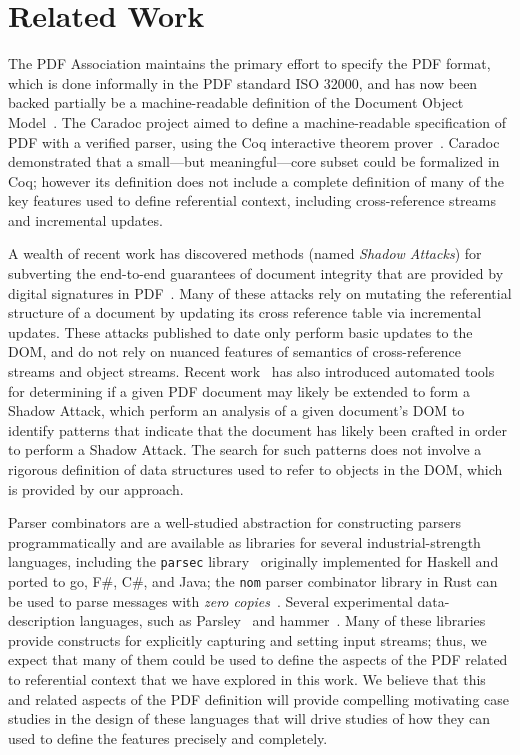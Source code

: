 \section{Related Work}
\label{sec:rel-work}

The PDF Association maintains the primary effort to specify the PDF
format, which is done informally in the PDF standard ISO 32000, and has now
been backed partially be a machine-readable definition of the Document
Object Model~\cite{peterwyattArlingtonPDFModel2021}.
%
The Caradoc project aimed to define a machine-readable specification
of PDF with a verified parser, using the Coq interactive theorem
prover~\cite{g.endignouxCaradocPragmaticApproach2016}.
%
Caradoc demonstrated that a small---but meaningful---core subset could
be formalized in Coq;
%
however its definition does not include a complete definition of many
of the key features used to define referential context, including
cross-reference streams and incremental updates.

A wealth of recent work has discovered methods (named \emph{Shadow
  Attacks}) for subverting the end-to-end guarantees of document
integrity that are provided by digital signatures in
PDF~\cite{mullerPracticalDecryptionExFiltration2019,mladenovTrillionDollarRefund2019,mullerProcessingDangerousPaths2021,ndsssymposiumNDSS2021Shadow2021,rohlmannBreakingSpecificationPDF2021}.
%
Many of these attacks rely on mutating the referential structure of a
document by updating its cross reference table via incremental
updates.
%
These attacks published to date only perform basic
updates to the DOM, and do not rely on nuanced features of semantics
of cross-reference streams and object streams.
%
Recent work~\cite{itextShadowAttack} has also introduced automated
tools for determining if a given PDF document may likely be extended
to form a Shadow Attack, which perform an analysis of a given
document's DOM to identify patterns that indicate that the document
has likely been crafted in order to perform a Shadow Attack.
%
The search for such patterns does not involve a rigorous definition of
data structures used to refer to objects in the DOM, which is provided
by our approach.

Parser combinators are a well-studied abstraction for constructing
parsers programmatically and are available as libraries for several
industrial-strength languages, including the \texttt{parsec}
library~\cite{leijen2001parsec} originally implemented for Haskell and
ported to go, F\#, C\#, and Java;
%
the \texttt{nom} parser combinator library in Rust can be used to
parse messages with \emph{zero copies}~\cite{couprie2015nom}.
%
Several experimental data-description languages, such as
Parsley~\cite{mundkurResearchReportParsley2020} and
hammer~\cite{bratus2017curing}.
%
Many of these libraries provide constructs for explicitly capturing
and setting input streams;
%
thus, we expect that many of them could be used to define the aspects
of the PDF related to referential context that we have explored in
this work.
%
We believe that this and related aspects of the PDF definition will
provide compelling motivating case studies in the design of these
languages that will drive studies of how they can used to define the
features precisely and completely.
